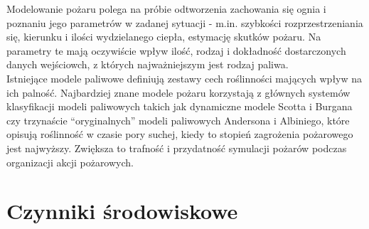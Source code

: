 \documentclass[a4paper, 11pt]{article}
\begin{document}
	Modelowanie pożaru polega na próbie odtworzenia zachowania się ognia i poznaniu jego parametrów w zadanej sytuacji - m.in. szybkości rozprzestrzeniania się, kierunku i ilości wydzielanego ciepła, estymację skutków pożaru. Na parametry te mają oczywiście wpływ ilość, rodzaj i dokładność dostarczonych danych wejściowch, z których najważniejszym jest rodzaj paliwa. \\
	\indent Istniejące modele paliwowe definiują zestawy cech roślinności mających wpływ na ich palność. Najbardziej znane modele pożaru korzystają z głównych systemów klasyfikacji modeli paliwowych takich jak dynamiczne modele Scotta i Burgana czy trzynaście ``oryginalnych'' modeli paliwowych Andersona i Albiniego, które opisują roślinność w czasie pory suchej, kiedy to stopień zagrożenia pożarowego jest najwyższy. Zwiększa to trafność i przydatność symulacji pożarów podczas organizacji akcji pożarowych.
	
	
	
	
	
	
	
	
	
	\section*{Czynniki środowiskowe}%
	
	\indent 
	
\end{document}
